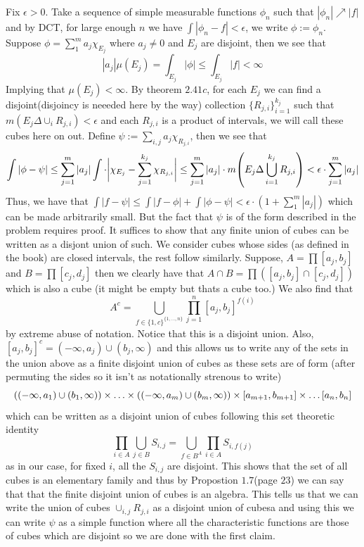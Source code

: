 \documentclass[12pt,a4paper]{article}
\begin{document}
\begin{solution}
    Fix $\epsilon>0$. 
	Take a sequence of simple measurable functions $\phi_n$ such that $|\phi_n|\nearrow|f|$ and by DCT, for large enough $n$ we have $\int|\phi_n-f|<\epsilon$, we write $\phi:=\phi_n$. 	Suppose $\phi=\sum_1^ma_j\chi_{E_j}$ where $a_j\neq 0$ and $E_j$ are disjoint, then we see that
	\[
		|a_j|\mu(E_j)=\int_{E_j}|\phi|\leq\int_{E_j}|f|<\infty
	\]
	Implying that $\mu(E_j)<\infty$. 
	By theorem $2.41c$, for each $E_j$ we can find a disjoint(disjoincy is neeeded here by the way) collection $\{R_{j,i}\}_{i=1}^{k_j}$ such that $m(E_j\Delta\cup_iR_{j,i})<\epsilon$ and each $R_{j,i}$ is a product of intervals, we will call these cubes here on out. 
	Define $\psi:=\sum_{i,j}a_{j}\chi_{R_{j,i}}$, then we see that
	\[
		\int|\phi-\psi|\leq\sum_{j=1}^m|a_j|\int\cdot\bigg|\chi_{E_j}-\sum_{j=1}^{k_j}\chi_{R_{j,i}}\bigg|\leq\sum_{j=1}^m|a_j|\cdot m\qty(E_j\Delta\bigcup_{i=1}^{k_j}R_{j,i})<\epsilon\cdot\sum_{j=1}^m|a_j|
	\]
	Thus, we have that $\int|f-\psi|\leq\int|f-\phi|+\int|\phi-\psi|<\epsilon\cdot(1+\sum_1^m|a_j|)$ which can be made arbitrarily small. 
	But the fact that $\psi$ is of the form described in the problem requires proof. 
	It suffices to show that any finite union of cubes can be written as a disjont union of such. 
	We consider cubes whose sides (as defined in the book) are closed intervals, the rest follow similarly. 
	Suppose, $A=\prod[a_j,b_j]$ and $B=\prod[c_j,d_j]$ then we clearly have that $A\cap B=\prod([a_j,b_j]\cap[c_j,d_j])$ which is also a cube (it might be empty but thats a cube too.) 
	We also find that 
	\[
		A^c=\bigcup_{f\in \{1,c\}^{\{1,\ldots,n\}}}\prod_{j=1}^n[a_j,b_j]^{f(i)}
	\]
	by extreme abuse of notation. 
	Notice that this is a disjoint union. 
	Also, $[a_j,b_j]^c=(-\infty,a_j)\cup(b_j,\infty)$ and this allows us to write any of the sets in the union above as a finite disjoint union of cubes as these sets are of form (after permuting the sides so it isn't as notationally strenous to write)
	\[
		\qty((-\infty,a_1)\cup(b_1,\infty))\times\ldots\times\qty((-\infty,a_m)\cup(b_m,\infty))\times[a_{m+1},b_{m+1}]\times\ldots[a_n,b_n]
	\]
	which can be written as a disjoint union of cubes following this set theoretic identity
	\[
		\prod_{i\in A}\bigcup_{j\in B}S_{i,j}=\bigcup_{f\in B^A}\prod_{i\in A}S_{i,f(j)}
	\]
	as in our case, for fixed $i$, all the $S_{i,j}$ are disjoint. 
	This shows that the set of all cubes is an elementary family and thus by Propostion $1.7$(page $23$) we can say that that the finite disjoint union of cubes is an algebra. 
	This tells us that we can write the union of cubes $\cup_{i,j}R_{j,i}$ as a disjoint union of cubesa and using this we can write $\psi$ as a simple function where all the characteristic functions are those of cubes which are disjoint so we are done with the first claim. 

\end{solution}
\end{document}
